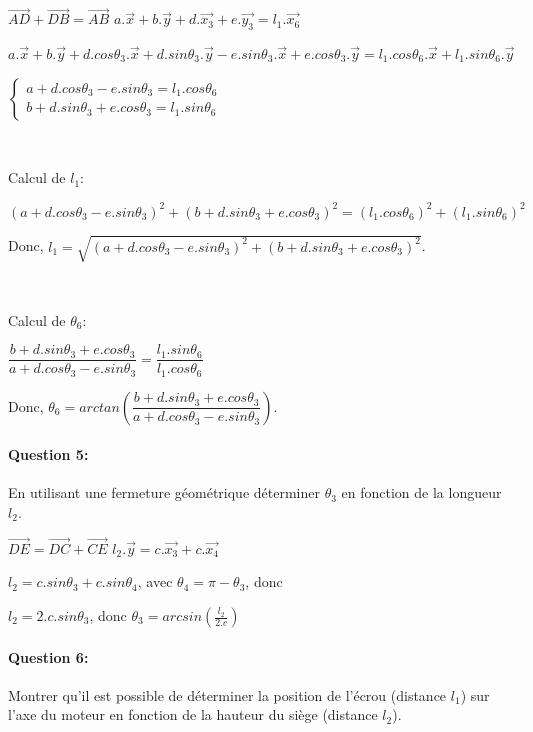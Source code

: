 $\overrightarrow{AD}+\overrightarrow{DB}=\overrightarrow{AB}$
$a.\overrightarrow{x}+b.\overrightarrow{y}+d.\overrightarrow{x_3}+e.\overrightarrow{y_3}=l_1.\overrightarrow{x_6}$

$a.\overrightarrow{x}+b.\overrightarrow{y}+d.cos\theta_3.\overrightarrow{x}+d.sin\theta_3.\overrightarrow{y}-e.sin\theta_3.\overrightarrow{x}+e.cos\theta_3.\overrightarrow{y}=l_1.cos\theta_6.\overrightarrow{x}+l_1.sin\theta_6.\overrightarrow{y}$

\begin{math}
\left\{\begin{array}{l}
a+d.cos\theta_3-e.sin\theta_3=l_1.cos\theta_6\\
b+d.sin\theta_3+e.cos\theta_3=l_1.sin\theta_6
\end{array}\right.
\end{math}

~\

Calcul de $l_1$:

$(a+d.cos\theta_3-e.sin\theta_3)^2+(b+d.sin\theta_3+e.cos\theta_3)^2=(l_1.cos\theta_6)^2+(l_1.sin\theta_6)^2$

Donc, $l_1=\sqrt{(a+d.cos\theta_3-e.sin\theta_3)^2+(b+d.sin\theta_3+e.cos\theta_3)^2}$.

~\

Calcul de $\theta_6$:

$\dfrac{b+d.sin\theta_3+e.cos\theta_3}{a+d.cos\theta_3-e.sin\theta_3}=\dfrac{l_1.sin\theta_6}{l_1.cos\theta_6}$

Donc, $\theta_6=arctan\left(\dfrac{b+d.sin\theta_3+e.cos\theta_3}{a+d.cos\theta_3-e.sin\theta_3}\right)$.

\paragraph{Question 5:} En utilisant une fermeture géométrique déterminer $\theta_3$ en fonction de la longueur $l_2$.

$\overrightarrow{DE}=\overrightarrow{DC}+\overrightarrow{CE}$
$l_2.\overrightarrow{y}=c.\overrightarrow{x_3}+c.\overrightarrow{x_4}$

$l_2=c.sin\theta_3+c.sin\theta_4$, avec $\theta_4=\pi-\theta_3$, donc

$l_2=2.c.sin\theta_3$, donc $\theta_3=arcsin\left(\frac{l_2}{2.c}\right)$

\paragraph{Question 6:} Montrer qu'il est possible de déterminer la position de l'écrou (distance $l_1$) sur l'axe du moteur en fonction de la hauteur du siège (distance $l_2$).


